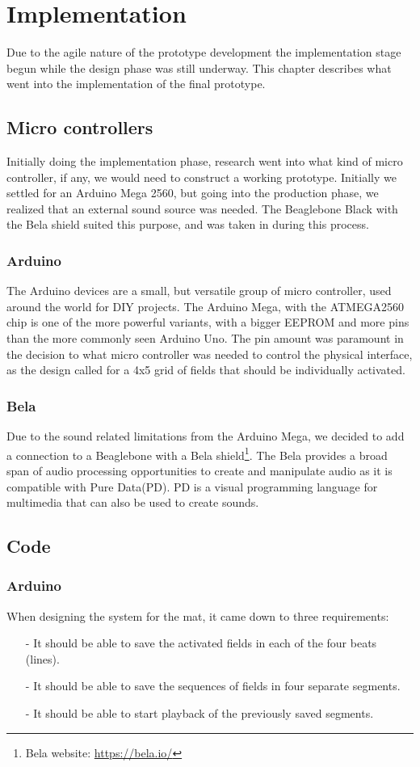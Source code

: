 \chapter{Implementation}%
Due to the agile nature of the prototype development the implementation stage begun while the design phase was still underway. This chapter describes what went into the implementation of the final prototype.

\section{Micro controllers}%
	Initially doing the implementation phase, research went into what kind of micro controller, if any, we would need to construct a working prototype. Initially we settled for an Arduino Mega 2560, but going into the production phase, we realized that an external sound source was needed. The Beaglebone Black with the Bela shield suited this purpose, and was taken in during this process.
	\subsection{Arduino}%
		The Arduino devices are a small, but versatile group of micro controller, used around the world for DIY projects. The Arduino Mega, with the ATMEGA2560 chip is one of the more powerful variants, with a bigger EEPROM and more pins than the more commonly seen Arduino Uno. The pin amount was paramount in the decision to what micro controller was needed to control the physical interface, as the design called for a 4x5 grid of fields that should be individually activated. 
		
	\subsection{Bela}%
		Due to the sound related limitations from the Arduino Mega, we decided to add a connection to a Beaglebone with a Bela shield\footnote{Bela website: \url{https://bela.io/}}. The Bela provides a broad span of audio processing opportunities to create and manipulate audio as it is compatible with Pure Data(PD). PD is a visual programming language for multimedia that can also be used to create sounds.
	
\section{Code}
	\subsection{Arduino}%
	When designing the system for the mat, it came down to three requirements:
	\begin{itemize}
		\item[-] It should be able to save the activated fields in each of the four beats (lines).
		\item[-] It should be able to save the sequences of fields in four separate segments.
		\item[-] It should be able to start playback of the previously saved segments.
	\end{itemize}
	
